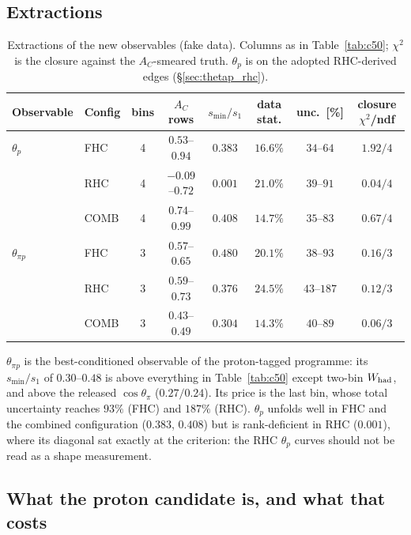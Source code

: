 \subsection{Extractions}

\begin{table}[H]
  \centering
  \caption{Extractions of the new observables (fake data). Columns as in Table~\ref{tab:c50};
    $\chi^2$ is the closure against the $A_C$-smeared truth. $\theta_p$ is on the adopted
    RHC-derived edges (\S\ref{sec:thetap_rhc}).}
  \label{tab:newobs_extract}
  \small
  \begin{tabular}{llcccccc}
    \toprule
    Observable & Config & bins & $A_C$ rows & $s_{\min}/s_1$ & data stat. & unc.\ [\%] & closure $\chi^2$/ndf \\
    \midrule
    $\theta_p$ & FHC & 4 & $0.53$--$0.94$ & $0.383$ & $16.6\%$ & $34$--$64$ & $1.92/4$ \\
               & RHC & 4 & $-0.09$--$0.72$ & $0.001$ & $21.0\%$ & $39$--$91$ & $0.04/4$ \\
               & COMB & 4 & $0.74$--$0.99$ & $0.408$ & $14.7\%$ & $35$--$83$ & $0.67/4$ \\
    $\theta_{\pi p}$ & FHC & 3 & $0.57$--$0.65$ & $0.480$ & $20.1\%$ & $38$--$93$ & $0.16/3$ \\
                     & RHC & 3 & $0.59$--$0.73$ & $0.376$ & $24.5\%$ & $43$--$187$ & $0.12/3$ \\
                     & COMB & 3 & $0.43$--$0.49$ & $0.304$ & $14.3\%$ & $40$--$89$ & $0.06/3$ \\
    \bottomrule
  \end{tabular}
\end{table}

$\theta_{\pi p}$ is the best-conditioned observable of the proton-tagged programme: its
$s_{\min}/s_1$ of $0.30$--$0.48$ is above everything in Table~\ref{tab:c50} except two-bin
$W_{\rm had}$, and above the released $\cos\theta_\pi$ ($0.27/0.24$). Its price is the last bin, whose
total uncertainty reaches $93\%$ (FHC) and $187\%$ (RHC). $\theta_p$ unfolds well in FHC and the
combined configuration ($0.383$, $0.408$) but is rank-deficient in RHC ($0.001$), where its diagonal
sat exactly at the criterion: the RHC $\theta_p$ curves should not be read as a shape measurement.

\subsection{What the proton candidate is, and what that costs}
\label{sec:prmatch}

